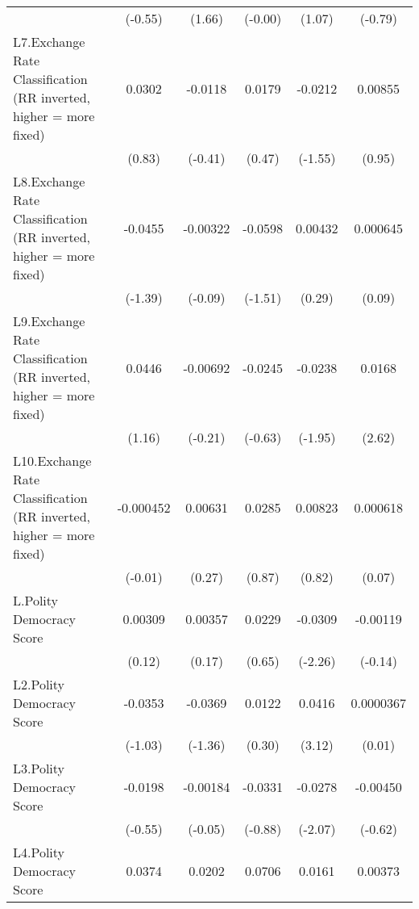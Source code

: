 {\begin{longtable}{l*{5}{c}}
                &  (-0.55)         &   (1.66)         &  (-0.00)         &   (1.07)         &  (-0.79)         \\
[1em]
L7.Exchange Rate Classification (RR inverted, higher = more fixed)&   0.0302         &  -0.0118         &   0.0179         &  -0.0212         &  0.00855         \\
                &   (0.83)         &  (-0.41)         &   (0.47)         &  (-1.55)         &   (0.95)         \\
[1em]
L8.Exchange Rate Classification (RR inverted, higher = more fixed)&  -0.0455         & -0.00322         &  -0.0598         &  0.00432         & 0.000645         \\
                &  (-1.39)         &  (-0.09)         &  (-1.51)         &   (0.29)         &   (0.09)         \\
[1em]
L9.Exchange Rate Classification (RR inverted, higher = more fixed)&   0.0446         & -0.00692         &  -0.0245         &  -0.0238         &   0.0168\sym{**} \\
                &   (1.16)         &  (-0.21)         &  (-0.63)         &  (-1.95)         &   (2.62)         \\
[1em]
L10.Exchange Rate Classification (RR inverted, higher = more fixed)&-0.000452         &  0.00631         &   0.0285         &  0.00823         & 0.000618         \\
                &  (-0.01)         &   (0.27)         &   (0.87)         &   (0.82)         &   (0.07)         \\
[1em]
L.Polity Democracy Score&  0.00309         &  0.00357         &   0.0229         &  -0.0309\sym{*}  & -0.00119         \\
                &   (0.12)         &   (0.17)         &   (0.65)         &  (-2.26)         &  (-0.14)         \\
[1em]
L2.Polity Democracy Score&  -0.0353         &  -0.0369         &   0.0122         &   0.0416\sym{**} &0.0000367         \\
                &  (-1.03)         &  (-1.36)         &   (0.30)         &   (3.12)         &   (0.01)         \\
[1em]
L3.Polity Democracy Score&  -0.0198         & -0.00184         &  -0.0331         &  -0.0278\sym{*}  & -0.00450         \\
                &  (-0.55)         &  (-0.05)         &  (-0.88)         &  (-2.07)         &  (-0.62)         \\
[1em]
L4.Polity Democracy Score&   0.0374         &   0.0202         &   0.0706\sym{*}  &   0.0161         &  0.00373         \\

\end{longtable}}
